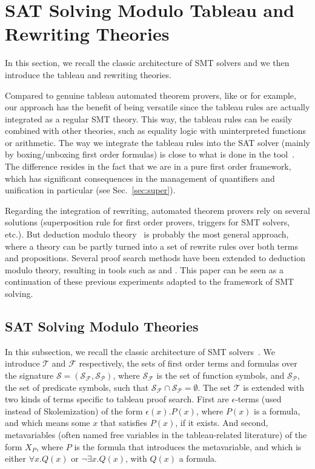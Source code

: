 
\section{SAT Solving Modulo Tableau and Rewriting Theories}
\label{sec:smt}

In this section, we recall the classic architecture of SMT solvers and we then
introduce the tableau and rewriting theories.

Compared to genuine tableau automated theorem provers, like \princess{} or
\zenon{} for example, our approach has the benefit of being versatile since the
tableau rules are actually integrated as a regular SMT theory. This way, the
tableau rules can be easily combined with other theories, such as equality logic
with uninterpreted functions or arithmetic. The way we integrate the tableau
rules into the SAT solver (mainly by boxing/unboxing first order formulas) is
close to what is done in the \satallax{} tool~\cite{CEB12}. The difference
resides in the fact that we are in a pure first order framework, which has
significant consequences in the management of quantifiers and unification in
particular (see Sec.~\ref{sec:super}).

Regarding the integration of rewriting, automated theorem provers rely on
several solutions (superposition rule for first order provers, triggers for SMT
solvers, etc.). But deduction modulo theory~\cite{DA03} is probably the most
general approach, where a theory can be partly turned into a set of rewrite
rules over both terms and propositions. Several proof search methods have been
extended to deduction modulo theory, resulting in tools such as \iproverm{} and
\zenm{}. This paper can be seen as a continuation of these previous experiments
adapted to the framework of SMT solving.

\subsection{SAT Solving Modulo Theories}

In this subsection, we recall the classic architecture of SMT
solvers~\cite{BEA06}. We introduce $\mathcal{T}$ and $\mathcal{F}$ respectively,
the sets of first order terms and formulas over the signature
$\mathcal{S}=(\mathcal{S}_\mathcal{F},\mathcal{S}_\mathcal{P})$, where
$\mathcal{S}_\mathcal{F}$ is the set of function symbols, and
$\mathcal{S}_\mathcal{P}$, the set of predicate symbols, such that
$\mathcal{S}_\mathcal{F}\cap\mathcal{S}_\mathcal{P}=\emptyset$. The set
$\mathcal{T}$ is extended with two kinds of terms specific to tableau proof
search. First are $\epsilon{}$-terms (used instead of Skolemization) of the form
$\epsilon(x).P(x)$, where $P(x)$ is a formula, and which means some $x$ that
satisfies $P(x)$, if it exists. And second, metavariables (often named free variables in
the tableau-related literature) of the form $X_P$, where $P$ is the formula that
introduces the metavariable, and which is either $\forall{}x.Q(x)$ or
$\neg\exists{}x.Q(x)$, with $Q(x)$ a formula.

